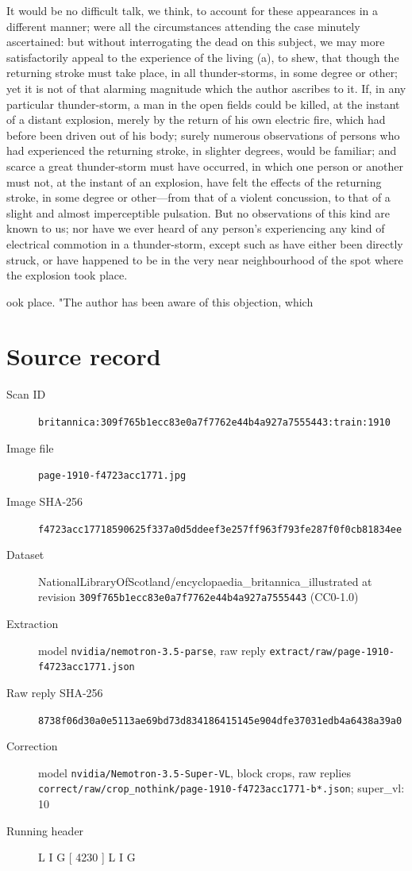 \documentclass{article}
\begin{document}
It would be no difficult talk, we think, to account for these appearances in a different manner; were all the circumstances attending the case minutely ascertained: but without interrogating the dead on this subject, we may more satisfactorily appeal to the experience of the living (a), to shew, that though the returning stroke must take place, in all thunder-storms, in some degree or other; yet it is not of that alarming magnitude which the author ascribes to it. If, in any particular thunder-storm, a man in the open fields could be killed, at the instant of a distant explosion, merely by the return of his own electric fire, which had before been driven out of his body; surely numerous observations of persons who had experienced the returning stroke, in slighter degrees, would be familiar; and scarce a great thunder-storm must have occurred, in which one person or another must not, at the instant of an explosion, have felt the effects of the returning stroke, in some degree or other—from that of a violent concussion, to that of a slight and almost imperceptible pulsation. But no observations of this kind are known to us; nor have we ever heard of any person's experiencing any kind of electrical commotion in a thunder-storm, except such as have either been directly struck, or have happened to be in the very near neighbourhood of the spot where the explosion took place.

ook place.
"The author has been aware of this objection, which


\section*{Source record}
\begin{description}
\item[Scan ID] \texttt{britannica:309f765b1ecc83e0a7f7762e44b4a927a7555443:train:1910}
\item[Image file] \texttt{page-1910-f4723acc1771.jpg}
\item[Image SHA-256] \texttt{f4723acc17718590625f337a0d5ddeef3e257ff963f793fe287f0f0cb81834ee}
\item[Dataset] NationalLibraryOfScotland/encyclopaedia\_britannica\_illustrated at revision \texttt{309f765b1ecc83e0a7f7762e44b4a927a7555443} (CC0-1.0)
\item[Extraction] model \texttt{nvidia/nemotron-3.5-parse}, raw reply \texttt{extract/raw/page-1910-f4723acc1771.json}
\item[Raw reply SHA-256] \texttt{8738f06d30a0e5113ae69bd73d834186415145e904dfe37031edb4a6438a39a0}
\item[Correction] model \texttt{nvidia/Nemotron-3.5-Super-VL}, block crops, raw replies \texttt{correct/raw/crop\_nothink/page-1910-f4723acc1771-b*.json}; super\_vl: 10
\item[Running header] L I G [ 4230 ] L I G
\end{description}
\end{document}
